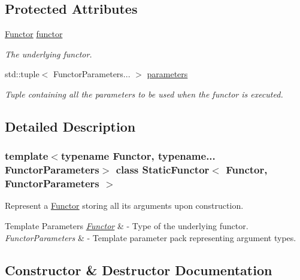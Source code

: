 \subsection*{Protected Attributes}
\begin{DoxyCompactItemize}
\item 
\mbox{\label{class_static_functor_aea8563c235a2dea8474da84504c51b58}} 
\mbox{\hyperlink{class_functor}{Functor}} \mbox{\hyperlink{class_static_functor_aea8563c235a2dea8474da84504c51b58}{functor}}
\begin{DoxyCompactList}\small\item\em The underlying functor. \end{DoxyCompactList}\item 
\mbox{\label{class_static_functor_aaa5d69cb0c000ea6c4846296de2c7f7f}} 
std\+::tuple$<$ Functor\+Parameters... $>$ \mbox{\hyperlink{class_static_functor_aaa5d69cb0c000ea6c4846296de2c7f7f}{parameters}}
\begin{DoxyCompactList}\small\item\em Tuple containing all the parameters to be used when the functor is executed. \end{DoxyCompactList}\end{DoxyCompactItemize}


\subsection{Detailed Description}
\subsubsection*{template$<$typename Functor, typename... Functor\+Parameters$>$\newline
class Static\+Functor$<$ Functor, Functor\+Parameters $>$}

Represent a \mbox{\hyperlink{class_functor}{Functor}} storing all its arguments upon construction. 
\begin{DoxyTemplParams}{Template Parameters}
{\em \mbox{\hyperlink{class_functor}{Functor}}} & -\/ Type of the underlying functor. \\
\hline
{\em Functor\+Parameters} & -\/ Template parameter pack representing argument types. \\
\hline
\end{DoxyTemplParams}


\subsection{Constructor \& Destructor Documentation}
\mbox{\label{class_static_functor_a61ee85704ebc97245006d4d8801fd58f}} 
